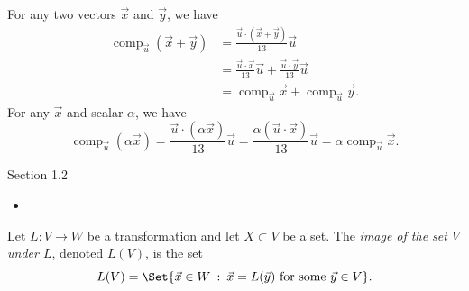 \documentclass{problemset}
\DeclareMathOperator{\Comp}{comp}
\providecommand\given{}
\newcommand\SetSymbol[1][]{%
	\nonscript\::%
	\allowbreak
	\nonscript\:
	\mathopen{}}
\renewcommand\given{\SetSymbol[\delimsize]}
\begin{document}
\begin{parts}
\begin{enumerate}
\begin{solution}
						For any two vectors $\vec x$ and $\vec y$, we have
						\begin{align*}
							\Comp_{\vec u}(\vec x + \vec y)&=\frac{\vec u\cdot(\vec x + \vec y)}{13}\vec u\\
							&=\frac{\vec u\cdot\vec x}{13}\vec u + \frac{\vec u\cdot\vec y}{13}\vec u\\
							&=\Comp_{\vec u}\vec x + \Comp_{\vec u}\vec y.
						\end{align*}
						For any $\vec x$ and scalar $\alpha$, we have
						\[
							\Comp_{\vec u}(\alpha\vec x)
							=\frac{\vec u\cdot(\alpha\vec x)}{13}\vec u
							=\frac{\alpha(\vec u\cdot\vec x)}{13}\vec u
							=\alpha\Comp_{\vec u}\vec x.
						\]
					\end{solution}
			\end{enumerate}
	\end{parts}

\begin{lesson}
	\newpage

	Section 1.2

	\begin{itemize}
		\item 
	\end{itemize}


	\newpage
\end{lesson}
	\begin{definition}
		Let $L:V\to W$ be a transformation and let $X\subset V$ be a set.
		The \emph{image of the set $V$ under $L$}, denoted $L(V)$, is the set
		\[
			L(V)=\Set{\vec x\in W \given \vec x=L(\vec y)\text{ for some }\vec y\in V}.
		\]
	\end{definition}
\end{document}
